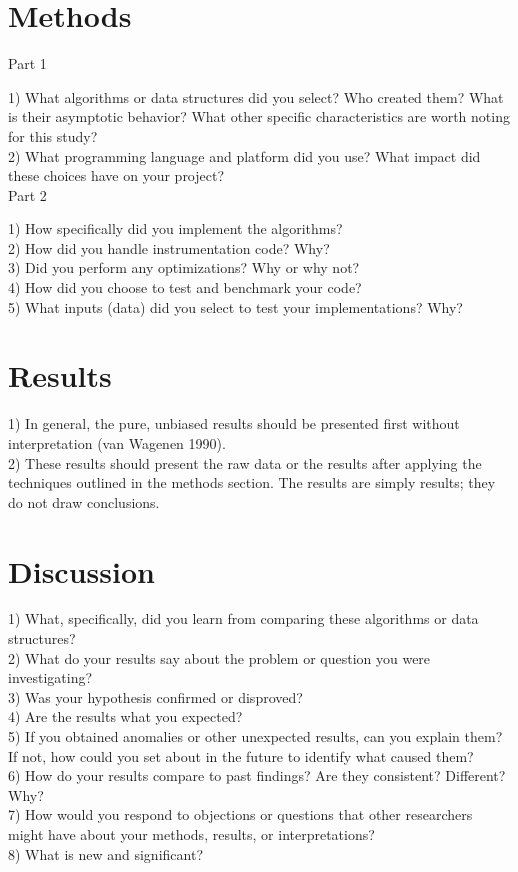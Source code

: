 \documentclass{amia}
\begin{document}
\section*{Methods}
Part 1

1) What algorithms or data structures did you select? Who created them? What is their asymptotic behavior? What other specific characteristics are worth noting for this study?\\
2) What programming language and platform did you use? What impact did these choices have on your project?\\


Part 2

1) How specifically did you implement the algorithms?\\
2) How did you handle instrumentation code? Why?\\
3) Did you perform any optimizations? Why or why not?\\
4) How did you choose to test and benchmark your code?\\
5) What inputs (data) did you select to test your implementations? Why?\\
 
\section*{Results}

1) In general, the pure, unbiased results should be presented first without interpretation (van Wagenen 1990). \\
2) These results should present the raw data
or the results after applying the techniques outlined in the methods section. The results are simply results; they do not draw conclusions.

\section*{Discussion}
1) What, specifically, did you learn from comparing these algorithms or data structures? \\
2) What do your results say about the problem or question you were investigating?\\
3) Was your hypothesis confirmed or disproved?\\
4) Are the results what you expected?\\
5) If you obtained anomalies or other unexpected results, can you explain them? If not, how could you set about in the future to identify what caused them? \\
6) How do your results compare to past findings? Are they consistent? Different?Why? \\
7) How would you respond to objections or questions that other researchers might have about your methods, results, or interpretations? \\
8) What is new and significant?\\
 
\end{document}
